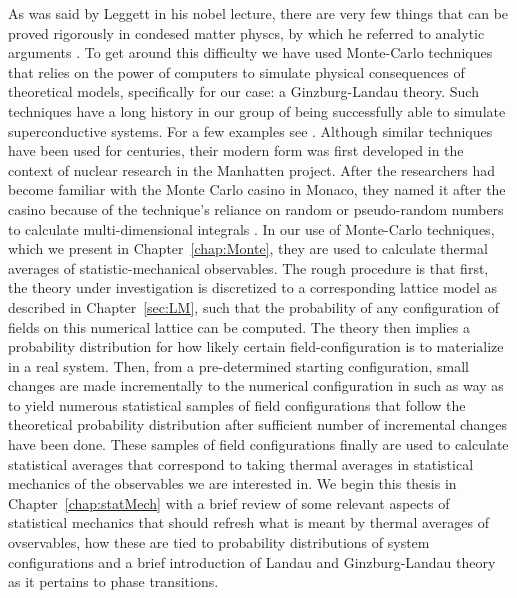 As was said by Leggett in his nobel lecture, there are very few things that can be proved rigorously in condesed matter physcs, by which he referred to analytic
arguments \cite{Leggett03}. To get around this difficulty we have used Monte-Carlo techniques that relies on the power of computers to simulate physical
consequences of theoretical models, specifically for our case: a Ginzburg-Landau theory. Such techniques have a long history in our group of being successfully
able to simulate superconductive systems. For a few examples see \cite{Nguyen99PRB, Smiseth05, Smorgrav05, Bojesen14, Galteland15}. Although similar techniques
have been used for centuries, their modern form
was first developed in the context of nuclear research in the Manhatten project. After the researchers had become familiar with the Monte Carlo casino in Monaco,
they named it after the casino because of the technique's reliance on random or pseudo-random numbers to
calculate multi-dimensional integrals \cite{Metropolis87}. In our use of Monte-Carlo techniques, which we present in Chapter~\ref{chap:Monte}, they are used
to calculate thermal averages of statistic-mechanical
observables. The rough procedure is that first, the theory under investigation is discretized to a corresponding lattice model as described in Chapter~\ref{sec:LM},
such that the probability of any configuration of fields on this numerical lattice can be computed. The theory then implies a probability distribution for how
likely certain field-configuration is to materialize in a real system.
Then, from a pre-determined starting configuration, small changes are made incrementally to the numerical configuration in such
as way as to yield numerous statistical samples of field configurations that follow the theoretical probability distribution after sufficient number of
incremental changes have been done. These samples of field configurations finally are used to calculate statistical averages that correspond to taking
thermal averages in statistical mechanics of the observables we are interested in. We begin this thesis in Chapter~\ref{chap:statMech} with a brief review
of some relevant aspects of statistical mechanics that should refresh what is meant by thermal averages of ovservables, how these are tied to probability
distributions of system configurations and a brief introduction of Landau and Ginzburg-Landau theory as it pertains to phase transitions.

